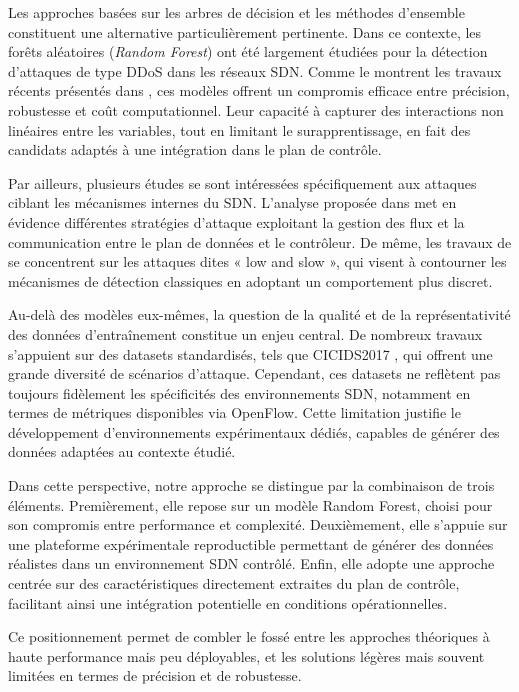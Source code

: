 \documentclass[11pt]{article}
\begin{document}
Les approches basées sur les arbres de décision et les méthodes d’ensemble constituent une alternative particulièrement pertinente. Dans ce contexte, les forêts aléatoires (\textit{Random Forest}) ont été largement étudiées pour la détection d’attaques de type DDoS dans les réseaux SDN. Comme le montrent les travaux récents présentés dans \cite{ref4}, ces modèles offrent un compromis efficace entre précision, robustesse et coût computationnel. Leur capacité à capturer des interactions non linéaires entre les variables, tout en limitant le surapprentissage, en fait des candidats adaptés à une intégration dans le plan de contrôle.

Par ailleurs, plusieurs études se sont intéressées spécifiquement aux attaques ciblant les mécanismes internes du SDN. L’analyse proposée dans \cite{ref2} met en évidence différentes stratégies d’attaque exploitant la gestion des flux et la communication entre le plan de données et le contrôleur. De même, les travaux de \cite{ref3} se concentrent sur les attaques dites « low and slow », qui visent à contourner les mécanismes de détection classiques en adoptant un comportement plus discret.

Au-delà des modèles eux-mêmes, la question de la qualité et de la représentativité des données d’entraînement constitue un enjeu central. De nombreux travaux s’appuient sur des datasets standardisés, tels que CICIDS2017 \cite{cicids}, qui offrent une grande diversité de scénarios d’attaque. Cependant, ces datasets ne reflètent pas toujours fidèlement les spécificités des environnements SDN, notamment en termes de métriques disponibles via OpenFlow. Cette limitation justifie le développement d’environnements expérimentaux dédiés, capables de générer des données adaptées au contexte étudié.

Dans cette perspective, notre approche se distingue par la combinaison de trois éléments. Premièrement, elle repose sur un modèle Random Forest, choisi pour son compromis entre performance et complexité. Deuxièmement, elle s’appuie sur une plateforme expérimentale reproductible permettant de générer des données réalistes dans un environnement SDN contrôlé. Enfin, elle adopte une approche centrée sur des caractéristiques directement extraites du plan de contrôle, facilitant ainsi une intégration potentielle en conditions opérationnelles.

Ce positionnement permet de combler le fossé entre les approches théoriques à haute performance mais peu déployables, et les solutions légères mais souvent limitées en termes de précision et de robustesse.
\end{document}
